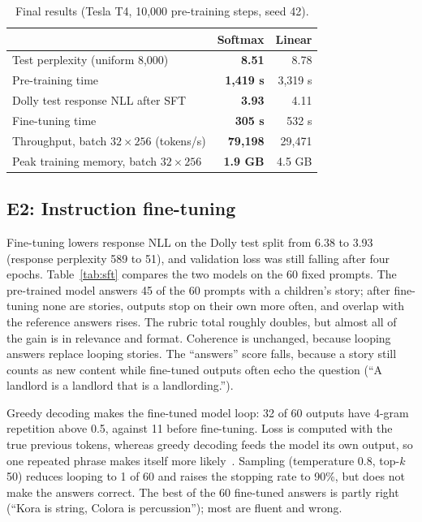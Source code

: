 \documentclass[conference]{IEEEtran}
\begin{document}
\begin{table}[t]
\centering
\caption{Final results (Tesla T4, 10{,}000 pre-training steps, seed 42).}
\label{tab:main}
\begin{tabular}{@{}lrr@{}}
\toprule
 & Softmax & Linear \\
\midrule
Test perplexity (uniform 8{,}000) & \textbf{8.51} & 8.78 \\
Pre-training time & \textbf{1{,}419 s} & 3{,}319 s \\
Dolly test response NLL after SFT & \textbf{3.93} & 4.11 \\
Fine-tuning time & \textbf{305 s} & 532 s \\
Throughput, batch $32\times256$ (tokens/s) & \textbf{79{,}198} & 29{,}471 \\
Peak training memory, batch $32\times256$ & \textbf{1.9 GB} & 4.5 GB \\
\bottomrule
\end{tabular}
\end{table}

\subsection{E2: Instruction fine-tuning}
Fine-tuning lowers response NLL on the Dolly test split from 6.38 to 3.93 (response perplexity 589 to 51), and
validation loss was still falling after four epochs. Table~\ref{tab:sft} compares the two models on the 60 fixed
prompts. The pre-trained model answers 45 of the 60 prompts with a children's story; after fine-tuning none are
stories, outputs stop on their own more often, and overlap with the reference answers rises. The rubric total roughly
doubles, but almost all of the gain is in relevance and format. Coherence is unchanged, because looping answers
replace looping stories. The ``answers'' score falls, because a story still counts as new content while fine-tuned
outputs often echo the question (``A landlord is a landlord that is a landlording.'').

Greedy decoding makes the fine-tuned model loop: 32 of 60 outputs have 4-gram repetition above 0.5, against 11
before fine-tuning. Loss is computed with the true previous tokens, whereas greedy decoding feeds the model its own
output, so one repeated phrase makes itself more likely~\cite{holtzman}. Sampling (temperature 0.8, top-$k$ 50)
reduces looping to 1 of 60 and raises the stopping rate to 90\%, but does not make the answers correct. The best of
the 60 fine-tuned answers is partly right (``Kora is string, Colora is percussion''); most are fluent and wrong.
\end{document}
